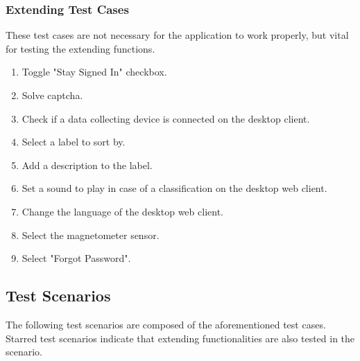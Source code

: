 \subsubsection{Extending Test Cases}
These test cases are not necessary for the application to work properly, but vital for testing the extending functions. 
\begin{enumerate}[resume*]
    \item Toggle "Stay Signed In" checkbox.
    \item Solve captcha.
    \item Check if a data collecting device is connected on the desktop client.
    \item Select a label to sort by.
    \item Add a description to the label.
    \item Set a sound to play in case of a classification on the desktop web client.
    \item Change the language of the desktop web client.
    \item Select the magnetometer sensor.
    \item Select "Forgot Password".
\end{enumerate}

\subsection{Test Scenarios}
The following test scenarios are composed of the aforementioned test cases. Starred test scenarios indicate that extending functionalities are also tested in the scenario.
